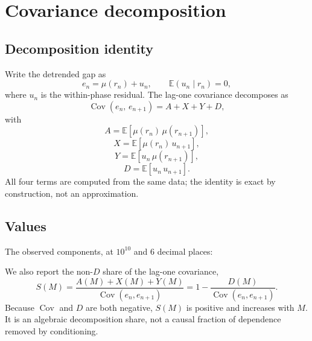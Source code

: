 \section{Covariance decomposition}

\subsection{Decomposition identity}

Write the detrended gap as
\[
e_n = \mu(r_n) + u_n,\qquad \mathbb{E}(u_n \mid r_n) = 0,
\]
where $u_n$ is the within-phase residual. The lag-one covariance decomposes as
\[
\operatorname{Cov}(e_n,\,e_{n+1}) = A + X + Y + D,
\]
with
\[
A = \mathbb{E}\!\left[\mu(r_n)\,\mu(r_{n+1})\right],
\]
\[
X = \mathbb{E}\!\left[\mu(r_n)\,u_{n+1}\right],
\]
\[
Y = \mathbb{E}\!\left[u_n\,\mu(r_{n+1})\right],
\]
\[
D = \mathbb{E}\!\left[u_n\,u_{n+1}\right].
\]
All four terms are computed from the same data; the identity is exact by construction, not an approximation.

\subsection{Values}

The observed components, at $10^{10}$ and 6 decimal places:

We also report the non-$D$ share of the lag-one covariance,
\begin{equation}
  S(M) = \frac{A(M)+X(M)+Y(M)}{\operatorname{Cov}(e_n,e_{n+1})}
       = 1 - \frac{D(M)}{\operatorname{Cov}(e_n,e_{n+1})}.
\end{equation}
Because $\operatorname{Cov}$ and $D$ are both negative, $S(M)$ is
positive and increases with $M$. It is an algebraic decomposition
share, not a causal fraction of dependence removed by conditioning.

